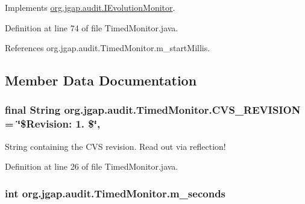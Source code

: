 Implements \hyperlink{interfaceorg_1_1jgap_1_1audit_1_1_i_evolution_monitor_a4352de2b8b067f78d8a4befcd6bf6593}{org.\-jgap.\-audit.\-I\-Evolution\-Monitor}.



Definition at line 74 of file Timed\-Monitor.\-java.



References org.\-jgap.\-audit.\-Timed\-Monitor.\-m\-\_\-start\-Millis.



\subsection{Member Data Documentation}
\hypertarget{classorg_1_1jgap_1_1audit_1_1_timed_monitor_a9302a98eb4a32d7f0b357cba2df06682}{
\subsubsection[{C\-V\-S\-\_\-\-R\-E\-V\-I\-S\-I\-O\-N}]{\setlength{\rightskip}{0pt plus 5cm}final String org.\-jgap.\-audit.\-Timed\-Monitor.\-C\-V\-S\-\_\-\-R\-E\-V\-I\-S\-I\-O\-N = \char`\"{}\$Revision\-: 1. \$\char`\"{}\hspace{0.3cm}{\ttfamily [static]}, {\ttfamily [private]}}}\label{classorg_1_1jgap_1_1audit_1_1_timed_monitor_a9302a98eb4a32d7f0b357cba2df06682}
String containing the C\-V\-S revision. Read out via reflection! 

Definition at line 26 of file Timed\-Monitor.\-java.

\hypertarget{classorg_1_1jgap_1_1audit_1_1_timed_monitor_a195eef87bf3426669b3bf8e8660707e7}{
\subsubsection[{m\-\_\-seconds}]{\setlength{\rightskip}{0pt plus 5cm}int org.\-jgap.\-audit.\-Timed\-Monitor.\-m\-\_\-seconds\hspace{0.3cm}{\ttfamily [private]}}}\label{classorg_1_1jgap_1_1audit_1_1_timed_monitor_a195eef87bf3426669b3bf8e8660707e7}


